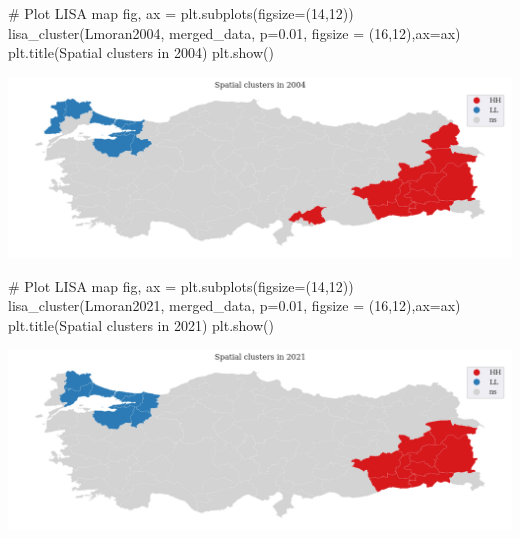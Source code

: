 \documentclass[
  letterpaper,
  DIV=11,
  numbers=noendperiod]{scrreprt}
\newenvironment{Shaded}{\begin{snugshade}}{\end{snugshade}}
\newcommand{\CommentTok}[1]{\textcolor[rgb]{0.37,0.37,0.37}{#1}}
\newcommand{\DecValTok}[1]{\textcolor[rgb]{0.68,0.00,0.00}{#1}}
\newcommand{\FloatTok}[1]{\textcolor[rgb]{0.68,0.00,0.00}{#1}}
\newcommand{\NormalTok}[1]{\textcolor[rgb]{0.00,0.23,0.31}{#1}}
\newcommand{\OperatorTok}[1]{\textcolor[rgb]{0.37,0.37,0.37}{#1}}
\newcommand{\StringTok}[1]{\textcolor[rgb]{0.13,0.47,0.30}{#1}}
\begin{document}
\begin{Shaded}
\begin{Highlighting}[]
\CommentTok{\# Plot LISA map}
\NormalTok{fig, ax }\OperatorTok{=}\NormalTok{ plt.subplots(figsize}\OperatorTok{=}\NormalTok{(}\DecValTok{14}\NormalTok{,}\DecValTok{12}\NormalTok{))}
\NormalTok{lisa\_cluster(Lmoran2004, merged\_data, p}\OperatorTok{=}\FloatTok{0.01}\NormalTok{, figsize }\OperatorTok{=}\NormalTok{ (}\DecValTok{16}\NormalTok{,}\DecValTok{12}\NormalTok{),ax}\OperatorTok{=}\NormalTok{ax)}
\NormalTok{plt.title(}\StringTok{\textquotesingle{}Spatial clusters in 2004\textquotesingle{}}\NormalTok{)}
\NormalTok{plt.show()}
\end{Highlighting}
\end{Shaded}

\includegraphics{labs/final_informal_files/figure-pdf/cell-30-output-1.png}

\begin{Shaded}
\begin{Highlighting}[]
\CommentTok{\# Plot LISA map}
\NormalTok{fig, ax }\OperatorTok{=}\NormalTok{ plt.subplots(figsize}\OperatorTok{=}\NormalTok{(}\DecValTok{14}\NormalTok{,}\DecValTok{12}\NormalTok{))}
\NormalTok{lisa\_cluster(Lmoran2021, merged\_data, p}\OperatorTok{=}\FloatTok{0.01}\NormalTok{, figsize }\OperatorTok{=}\NormalTok{ (}\DecValTok{16}\NormalTok{,}\DecValTok{12}\NormalTok{),ax}\OperatorTok{=}\NormalTok{ax)}
\NormalTok{plt.title(}\StringTok{\textquotesingle{}Spatial clusters in 2021\textquotesingle{}}\NormalTok{)}
\NormalTok{plt.show()}
\end{Highlighting}
\end{Shaded}

\includegraphics{labs/final_informal_files/figure-pdf/cell-31-output-1.png}
\end{document}
